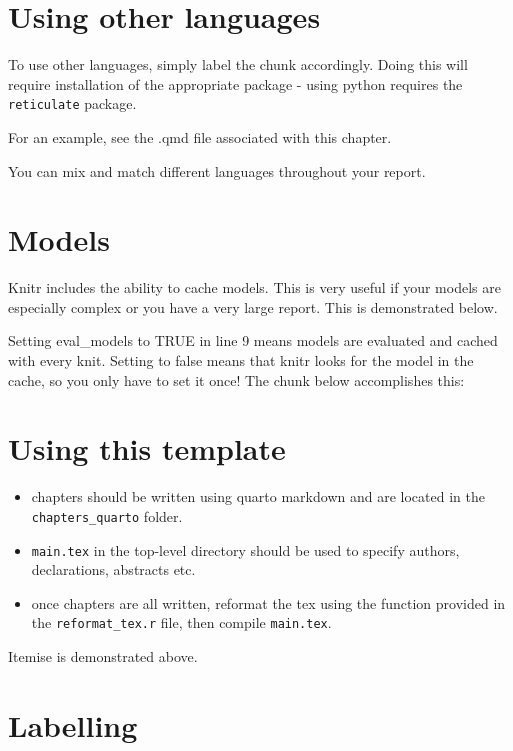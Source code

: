 \documentclass[../main.tex]{subfiles}
\begin{document}
\section{Using other languages}\label{using-other-languages}

To use other languages, simply label the chunk accordingly. Doing this
will require installation of the appropriate package - using python
requires the \texttt{reticulate} package.

For an example, see the .qmd file associated with this chapter.

You can mix and match different languages throughout your report.

\section{Models}\label{models}

Knitr includes the ability to cache models. This is very useful if your
models are especially complex or you have a very large report. This is
demonstrated below.

Setting eval\_models to TRUE in line 9 means models are evaluated and
cached with every knit. Setting to false means that knitr looks for the
model in the cache, so you only have to set it once! The chunk below
accomplishes this:

\section{Using this template}\label{using-this-template}

\begin{itemize}
\tightlist
\item
  chapters should be written using quarto markdown and are located in
  the \texttt{chapters\_quarto} folder.
\item
  \texttt{main.tex} in the top-level directory should be used to specify
  authors, declarations, abstracts etc.
\item
  once chapters are all written, reformat the tex using the function
  provided in the \texttt{reformat\_tex.r} file, then compile
  \texttt{main.tex}.
\end{itemize}

Itemise is demonstrated above.

\section{Labelling}\label{labelling}
\end{document}
